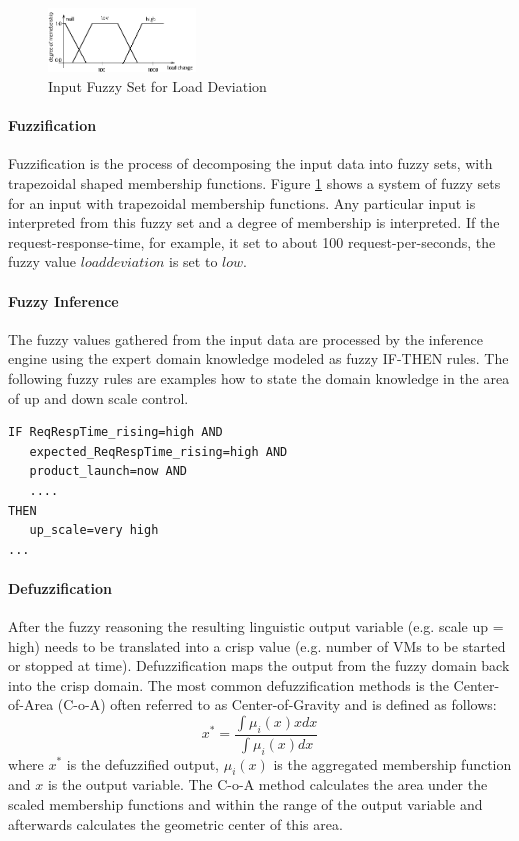 \begin{figure}[ht]
\begin{center}
\includegraphics[width=0.35\textwidth]{fig/fuzzy_load_usage.png}
\end{center}
\caption{Input Fuzzy Set for Load Deviation}
\label{fig:fuzzy_inputset}
\end{figure}

\paragraph*{Fuzzification}
Fuzzification is the process of decomposing the input data into fuzzy sets, with trapezoidal shaped membership functions. Figure \ref{fig:fuzzy_inputset} shows a system of fuzzy sets for an input with trapezoidal membership functions. Any particular input is interpreted from this fuzzy set and a degree of membership is interpreted. If the request-response-time, for example, it set to about 100 request-per-seconds, the fuzzy value $load deviation$ is set to $low$.

\paragraph*{Fuzzy Inference}
The fuzzy values gathered from the input data are processed by the inference engine using the expert domain knowledge modeled as fuzzy IF-THEN rules. The following fuzzy rules are examples how to state the domain knowledge in the area of up and down scale control.
\begin{verbatim}
IF ReqRespTime_rising=high AND
   expected_ReqRespTime_rising=high AND
   product_launch=now AND
   ....
THEN
   up_scale=very high
...
\end{verbatim}

\paragraph*{Defuzzification}
After the fuzzy reasoning the resulting linguistic output variable (e.g. scale up = high) needs to be translated into a crisp value (e.g. number of VMs to be started or stopped at time). Defuzzification maps the output from the fuzzy domain back into the crisp domain. The most common defuzzification methods is the Center-of-Area (C-o-A) often referred to as Center-of-Gravity and is defined as follows:
\begin{equation}
x^{*} = \frac{\int \mu_{i}(x) x dx}{\int \mu_{i}(x) dx}
\end{equation}
where $x^{*}$ is the defuzzified output, $\mu_{i}(x)$ is the aggregated membership function and $x$ is the output variable. The C-o-A method calculates the area under the scaled membership functions and within the range of the output variable and afterwards calculates the geometric center of this area.


